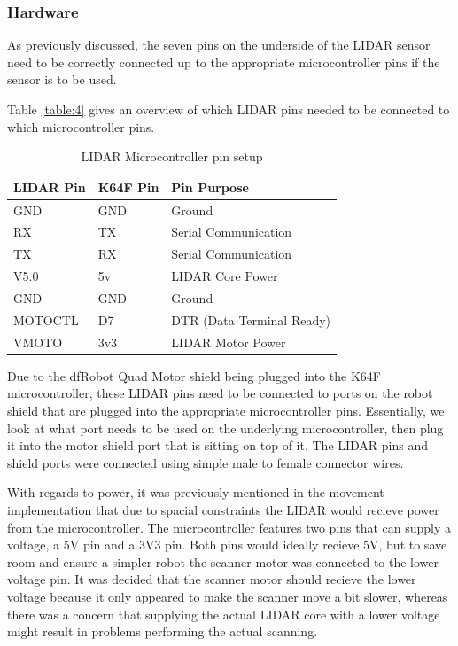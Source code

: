 				\subsubsection{Hardware}
				As previously discussed, the seven pins on the underside of the LIDAR sensor need to be correctly connected up to the appropriate microcontroller pins if the sensor is to be used.
				
				Table \ref{table:4} gives an overview of which LIDAR pins needed to be connected to which microcontroller pins.
				
				\begin{table}[h!]
					\centering
					\begin{tabular}{| l | l | l |} 
						\hline
						LIDAR Pin & K64F Pin & Pin Purpose \\ [0.5ex] 
						\hline
						GND  & GND & Ground  \\ 
						RX  & TX  & Serial Communication \\
						TX  & RX & Serial Communication \\
						V5.0 & 5v & LIDAR Core Power \\ 
						GND & GND & Ground \\ 
						MOTOCTL & D7 & DTR (Data Terminal Ready) \\ 
						VMOTO & 3v3 & LIDAR Motor Power \\ [1ex] 
						\hline
					\end{tabular}
					\caption{LIDAR Microcontroller pin setup}
					\label{table:3}
				\end{table}
			
				Due to the dfRobot Quad Motor shield being plugged into the K64F microcontroller, these LIDAR pins need to be connected to ports on the robot shield that are plugged into the appropriate microcontroller pins. Essentially, we look at what port needs to be used on the underlying microcontroller, then plug it into the motor shield port that is sitting on top of it. The LIDAR pins and shield ports were connected using simple male to female connector wires.
				
				With regards to power, it was previously mentioned in the movement implementation that due to spacial constraints the LIDAR would recieve power from the microcontroller. The microcontroller features two pins that can supply a voltage, a 5V pin and a 3V3 pin. Both pins would ideally recieve 5V, but to save room and ensure a simpler robot the scanner motor was connected to the lower voltage pin. It was decided that the scanner motor should recieve the lower voltage because it only appeared to make the scanner move a bit slower, whereas there was a concern that supplying the actual LIDAR core with a lower voltage might result in problems performing the actual scanning. 
				

